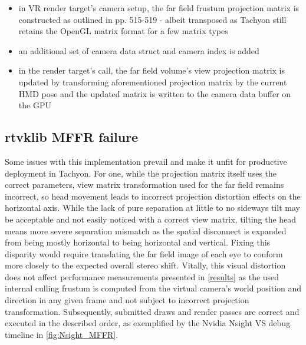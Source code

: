 \begin{itemize}
\item in \gls{VR} render target's camera setup, the far field frustum projection matrix is constructed as outlined in \cite{Lapinski.2017} pp. 515-519 - albeit transposed as \gls{Tachyon} still retains the OpenGL matrix format for a few matrix types
\item an additional set of camera data struct and camera index is added
\item in the render target's  call, the far field volume's view projection matrix is updated by transforming aforementioned projection matrix by the current \gls{HMD} pose and the updated matrix is written to the camera data buffer on the GPU
\end{itemize}

\subsection{\gls{rtvklib} \gls{MFFR} failure} \label{MFFR_failure}
Some issues with this implementation prevail and make it unfit for productive deployment in \gls{Tachyon}. For one, while the projection matrix itself uses the correct parameters, view matrix transformation used for the far field remains incorrect, so head movement leads to incorrect projection distortion effects on the horizontal axis. While the lack of pure separation at little to no sideways tilt may be acceptable and not easily noticed with a correct view matrix, tilting the head means more severe separation mismatch as the spatial disconnect is expanded from being mostly horizontal to being horizontal and vertical. Fixing this disparity would require translating the far field image of each eye to conform more closely to the expected overall stereo shift. 
Vitally, this visual distortion does not affect performance measurements presented in \autoref{results} as the used internal culling frustum is computed from the virtual camera's world position and direction in any given frame and not subject to incorrect projection transformation. Subsequently, submitted draws and render passes are correct and executed in the described order, as exemplified by the Nvidia \gls{Nsight VS} debug timeline in \autoref{fig:Nsight_MFFR}. 

